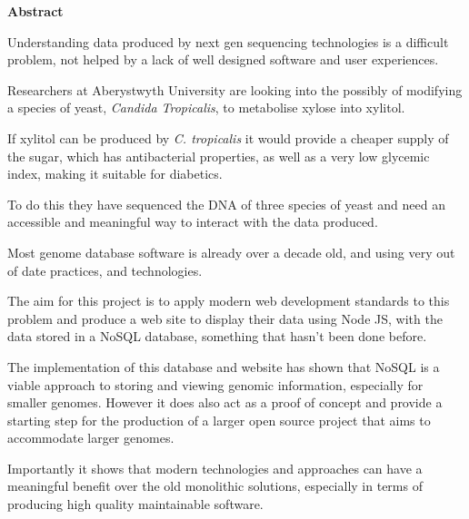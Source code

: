 \thispagestyle{empty}

\begin{center}
    {\LARGE\bf Abstract}
\end{center}

Understanding data produced by next gen sequencing technologies is a difficult problem, not helped by a lack of well designed software and user experiences. 

Researchers at Aberystwyth University are looking into the possibly of modifying a species of yeast, \textit{Candida Tropicalis}, to metabolise xylose into xylitol. 

If xylitol can be produced by \textit{C. tropicalis} it would provide a cheaper supply of the sugar, which has antibacterial properties, as well as a very low glycemic index, making it suitable for diabetics.

To do this they have sequenced the DNA of three species of yeast and need an accessible and meaningful way to interact with the data produced. 

Most genome database software is already over a decade old, and using very out of date practices, and technologies. 

The aim for this project is to apply modern web development standards to this problem and produce a web site to display their data using Node JS, with the data stored in a NoSQL database, something that hasn't been done before. 

The implementation of this database and website has shown that NoSQL is a viable approach to storing and viewing genomic information, especially for smaller genomes. However it does also act as a proof of concept and provide a starting step for the production of a larger open source project that aims to accommodate larger genomes. 

Importantly it shows that modern technologies and approaches can have a meaningful benefit over the old monolithic solutions, especially in terms of producing high quality maintainable software.
